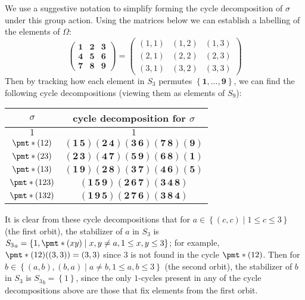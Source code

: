 \documentclass[11pt]{article}
\newcommand{\cbr}[1]{\left\{#1\right\}}
\begin{document}
\begin{enumerate}
    We use a suggestive notation to simplify forming the cycle decomposition of $\sigma$ under this group action. Using the matrices below we can establish a labelling of the elements of $\Omega$:
    \[\begin{pmatrix}
        \mathbf{1} & \mathbf{2} & \mathbf{3} \\
        \mathbf{4} & \mathbf{5} & \mathbf{6} \\
        \mathbf{7} & \mathbf{8} & \mathbf{9} 
    \end{pmatrix} = \begin{pmatrix}
        (1,1) & (1,2) & (1,3) \\
        (2,1) & (2,2) & (2,3) \\
        (3,1) & (3,2) & (3,3) 
    \end{pmatrix}\]
    Then by tracking how each element in $S_3$ permutes $\cbr{\mathbf{1},\dots,\mathbf{9}}$, we can find the following cycle decompositions (viewing them as elements of $S_9$):
    \begin{center}
        \begin{tabular}{c|c}
            $\sigma$ & cycle decomposition for $\sigma$ \\
            \hline
            $1$ & $1$ \\
            $\pmt*{(12)}$ & $(\mathbf{1}\,\mathbf{5})(\mathbf{2}\,\mathbf{4})(\mathbf{3}\,\mathbf{6})(\mathbf{7}\,\mathbf{8})(\mathbf{9})$ \\
            $\pmt*{(23)}$ & $(\mathbf{2}\,\mathbf{3})(\mathbf{4}\,\mathbf{7})(\mathbf{5}\,\mathbf{9})(\mathbf{6}\,\mathbf{8})(\mathbf{1})$ \\
            $\pmt*{(13)}$ & $(\mathbf{1}\,\mathbf{9})(\mathbf{2}\,\mathbf{8})(\mathbf{3}\,\mathbf{7})(\mathbf{4}\,\mathbf{6})(\mathbf{5})$ \\
            $\pmt*{(123)}$ & $(\mathbf{1}\,\mathbf{5}\,\mathbf{9})(\mathbf{2}\,\mathbf{6}\,\mathbf{7})(\mathbf{3}\,\mathbf{4}\,\mathbf{8})$ \\
            $\pmt*{(132)}$ & $(\mathbf{1}\,\mathbf{9}\,\mathbf{5})(\mathbf{2}\,\mathbf{7}\,\mathbf{6})(\mathbf{3}\,\mathbf{8}\,\mathbf{4})$
        \end{tabular}
    \end{center}
    It is clear from these cycle decompositions that for $a\in \cbr{(c,c)\mid 1\leq c \leq 3}$ (the first orbit), the stabilizer of $a$ in $S_3$ is ${S_3}_a = \cbr{1,\pmt*{(xy)} \mid x,y\neq a, 1\leq x,y\leq 3}$; for example, $\pmt*{(12)}((3,3)) = (3,3)$ since $3$ is not found in the cycle $\pmt*{(12)}$. Then for $b\in \cbr{(a,b),(b,a)\mid a\neq b, 1\leq a,b\leq 3}$ (the second orbit), the stabilizer of $b$ in $S_3$ is ${S_3}_b = \cbr{1}$, since the only $1$-cycles present in any of the cycle decompositions above are those that fix elements from the first orbit.


\end{enumerate}
\end{document}
